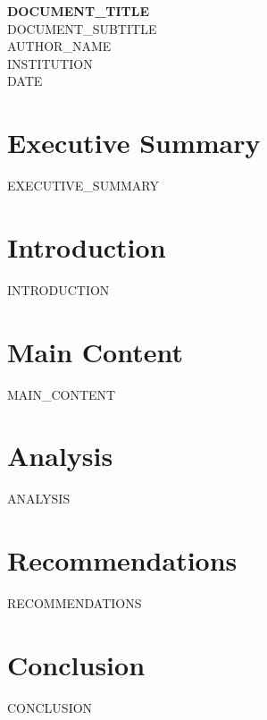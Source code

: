\documentclass[12pt,a4paper]{article}
\begin{document}
\begin{titlepage}
\centering
\vspace*{2cm}
{\Huge\bfseries {{DOCUMENT_TITLE}}}\\[0.5cm]
{\Large {{DOCUMENT_SUBTITLE}}}\\[1.5cm]
{\large {{AUTHOR_NAME}}}\\[0.5cm]
{\normalsize {{INSTITUTION}}}\\[2cm]
\vfill
{\large {{DATE}}}
\end{titlepage}

\tableofcontents
\newpage

\section{Executive Summary}
{{EXECUTIVE_SUMMARY}}

\section{Introduction}
{{INTRODUCTION}}

\section{Main Content}
{{MAIN_CONTENT}}

\section{Analysis}
{{ANALYSIS}}

\section{Recommendations}
{{RECOMMENDATIONS}}

\section{Conclusion}
{{CONCLUSION}}
\end{document}
